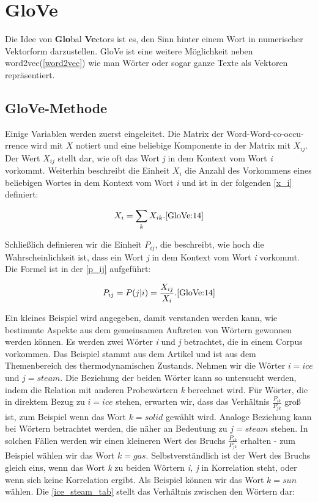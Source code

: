 \chapter{GloVe}

Die Idee von \textbf{Glo}bal \textbf{Ve}ctors ist es, den Sinn hinter einem Wort in numerischer Vektorform darzustellen. GloVe ist eine weitere Möglichkeit neben word2vec(\cref{word2vec}) wie man Wörter oder sogar ganze Texte als Vektoren repräsentiert.

\section{GloVe-Methode}
Einige Variablen werden zuerst eingeleitet. Die Matrix der Word-Word-co-occu-rrence wird mit \textbf{$X$} notiert und eine beliebige Komponente in der Matrix mit \textbf{$X_{ij}$}. Der Wert \textbf{$X_{ij}$} stellt dar, wie oft das Wort \textit{j} in dem Kontext vom Wort \textit{i} vorkommt. Weiterhin beschreibt die Einheit \textbf{$X_i$} die Anzahl des Vorkommens eines beliebigen Wortes in dem Kontext vom Wort \textit{i} und ist in der folgenden \cref{x_i} definiert:

\begin{equation}
	X_i = \sum_{k} X_{ik}. \cite{GloVe:14}
	\label{x_i}
\end{equation}

Schließlich definieren wir die Einheit \textbf{$P_{ij}$}, die beschreibt, wie hoch die Wahrscheinlichkeit ist, dass ein Wort \textit{j} in dem Kontext vom Wort \textit{i} vorkommt. Die Formel ist in der \cref{p_ij} aufgeführt:

\begin{equation}
	P_{ij} = P(j|i) = \frac{X_{ij}}{X_i}. \cite{GloVe:14}
	\label{p_ij}
\end{equation}

Ein kleines Beispiel wird angegeben, damit verstanden werden kann, wie bestimmte Aspekte aus dem gemeinsamen Auftreten von Wörtern gewonnen werden können. Es werden zwei Wörter \textit{i} und \textit{j} betrachtet, die in einem Corpus vorkommen. Das Beispiel stammt aus dem Artikel \cite{GloVe:14} und ist aus dem Themenbereich des thermodynamischen Zustands. Nehmen wir die Wörter \textit{$i = ice$} und \textit{$j = steam$}. Die Beziehung der beiden Wörter kann so untersucht werden, indem die Relation mit anderen Probewörtern \textit{k} berechnet wird. Für Wörter, die in direktem Bezug zu \textit{$i = ice$} stehen, erwarten wir, dass das Verhältnis $\frac{P_{ik}}{P_{jk}}$ groß ist, zum Beispiel wenn das Wort \textit{$k = solid$} gewählt wird. Analoge Beziehung kann bei Wörtern betrachtet werden, die näher an Bedeutung zu \textit{$j = steam$} stehen. In solchen Fällen werden wir einen kleineren Wert des Bruchs $\frac{P_{ik}}{P_{jk}}$ erhalten - zum Beispiel wählen wir das Wort \textit{$k = gas$}. Selbstverständlich ist der Wert des Bruchs gleich eins, wenn das Wort \textit{k} zu beiden Wörtern \textit{i, j} in Korrelation steht, oder wenn sich keine Korrelation ergibt. Als Beispiel können wir das Wort \textit{$k = sun$} wählen. Die \cref{ice_steam_tab} stellt das Verhältnis zwischen den Wörtern dar:

